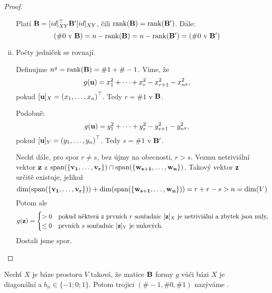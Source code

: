 \begin{proof}
\begin{enumerate}[i.]
            Platí $\mathbf{B} = [id]_{XY}^\top \mathbf{B}' [id]_{XY}$, čili 
            $\mathop{\mathrm{rank}}(\mathbf{B}) = \mathop{\mathrm{rank}}(\mathbf{B}')$. Dále: $$(\#0 \text{ v } \mathbf{B}) = 
            n - \mathop{\mathrm{rank}}(\mathbf{B}) = n - \mathop{\mathrm{rank}}(\mathbf{B}') = (\#0 \text{ v } \mathbf{B}')$$

        \item Počty jedniček se rovnají.

            Definujme $n^g = \mathop{\mathrm{rank}}(\mathbf{B}) = \#1 + \#-1$. Víme, že
            $$g(\mathbf{u}) = x_1^2 + \dots + x_r^2 - x_{r+1}^2 - x_{n^g}^2,$$
            pokud $[\mathbf{u}]_X = \left( x_1, \dots, x_n\right)^\top$. Tedy 
            $r = \#1$ v $\mathbf{B}$. 
            
            Podobně:
            $$g(\mathbf{u}) = y_1^2 + \dots + y_s^2 - y_{s+1}^2 - y_{n^g}^2,$$
            pokud $[\mathbf{u}]_Y = \left( y_1, \dots, y_n\right)^\top$. Tedy 
            $s = \#1$ v $\mathbf{B}'$.

            Nechť dále, pro spor $r \neq s$, bez újmy na obecnosti, $r > s.$
            Vezmu netriviální vektor $\mathbf{z}$ z $\mathop{\mathrm{span}}(\{\mathbf{v_1}, \dots, \mathbf{v_r}\})
            \cap \mathop{\mathrm{span}}(\{\mathbf{w_{s+1}}, \dots, \mathbf{w_n}\})$. Takový vektor $\mathbf{z}$ určitě
            existuje, jelikož
            $$\dim(\mathop{\mathrm{span}}(\{\mathbf{v_1}, \dots, \mathbf{v_r}\})) + 
            \dim(\mathop{\mathrm{span}}(\{\mathbf{w_{s+1}}, \dots, \mathbf{w_n}\})) = r + r-s > n 
            = \dim(V)$$
            Potom ale
            $$g(\mathbf{z}) = \begin{cases}
                >0 &\text{pokud některá z prvních $r$ souřadnic $[\mathbf{z}]_X$
                    je netriviální a zbytek jsou nuly,} \\
                \leq 0 &\text{prvních $s$ souřadnic $[\mathbf{z}]_Y$ je nulových.}
            \end{cases}$$
            Dostali jsme spor.
    \end{enumerate}
\end{proof}

\begin{definition}
    Nechť $X$ je báze prostoru $V$ taková, že
    matice $\mathbf{B}$ formy $g$ vůči bázi $X$ je diagonální a $b_{ii} \in
    \{-1;0;1\}$. Potom trojici $(\#-1, \#0, \#1)$ nazýváme 
    .
\end{definition}
